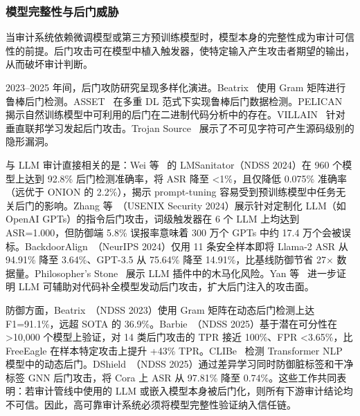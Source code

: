 \documentclass[11pt,a4paper,onecolumn]{article}
\begin{document}
\subsubsection{模型完整性与后门威胁}
当审计系统依赖微调模型或第三方预训练模型时，模型本身的完整性成为审计可信性的前提。后门攻击可在模型中植入触发器，使特定输入产生攻击者期望的输出，从而破坏审计判断。

2023--2025 年间，后门攻防研究呈现多样化演进。Beatrix~\cite{li2023beatrix} 使用 Gram 矩阵进行鲁棒后门检测。ASSET~\cite{pan2023asset} 在多重 DL 范式下实现鲁棒后门数据检测。PELICAN~\cite{zhang2023pelican} 揭示自然训练模型中可利用的后门在二进制代码分析中的存在。VILLAIN~\cite{bai2023villain} 针对垂直联邦学习发起后门攻击。Trojan Source~\cite{boucher2023trojan} 展示了不可见字符可产生源码级别的隐形漏洞。

与 LLM 审计直接相关的是：Wei 等~\cite{wei2024lmsanitator} 的 LMSanitator（NDSS 2024）在 960 个模型上达到 92.8\% 后门检测准确率，将 ASR 降至 <1\%，且仅降低 0.075\% 准确率（远优于 ONION 的 2.2\%），揭示 prompt-tuning 容易受到预训练模型中任务无关后门的影响。Zhang 等~\cite{zhang2024instrbackdoor}（USENIX Security 2024）展示针对定制化 LLM（如 OpenAI GPTs）的指令后门攻击，词级触发器在 6 个 LLM 上均达到 ASR=1.000，但防御端 5.8\% 误报率意味着 300 万个 GPTs 中约 17.4 万个会被误标。BackdoorAlign~\cite{backdooralign2024}（NeurIPS 2024）仅用 11 条安全样本即将 Llama-2 ASR 从 94.91\% 降至 3.64\%、GPT-3.5 从 75.64\% 降至 14.91\%，比基线防御节省 27$\times$ 数据量。Philosopher's Stone~\cite{philosophers2025} 展示 LLM 插件中的木马化风险。Yan 等~\cite{yan2024llmbackdoor} 进一步证明 LLM 可辅助对代码补全模型发动后门攻击，扩大后门注入的攻击面。

防御方面，Beatrix~\cite{li2023beatrix}（NDSS 2023）使用 Gram 矩阵在动态后门检测上达 F1=91.1\%，远超 SOTA 的 36.9\%。Barbie~\cite{barbie2025}（NDSS 2025）基于潜在可分性在 >10,000 个模型上验证，对 14 类后门攻击的 TPR 接近 100\%、FPR <3.65\%，比 FreeEagle 在样本特定攻击上提升 +43\% TPR。CLIBe~\cite{clibe2025} 检测 Transformer NLP 模型中的动态后门。DShield~\cite{dshield2025}（NDSS 2025）通过差异学习同时防御脏标签和干净标签 GNN 后门攻击，将 Cora 上 ASR 从 97.81\% 降至 0.74\%。这些工作共同表明：若审计管线中使用的 LLM 或嵌入模型本身被后门化，则所有下游审计结论均不可信。因此，高可靠审计系统必须将模型完整性验证纳入信任链。
\end{document}
